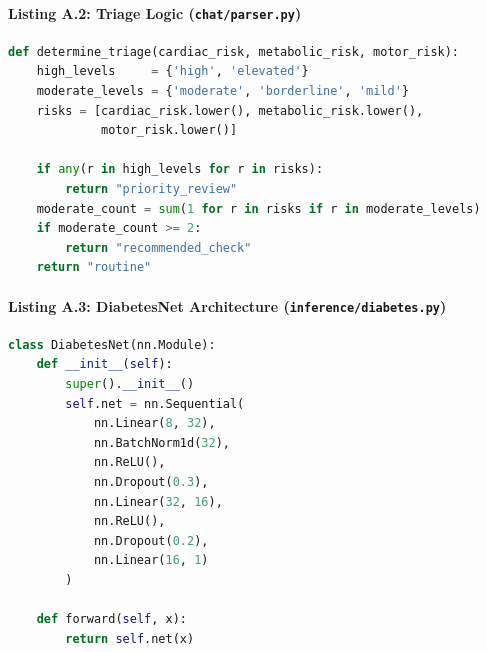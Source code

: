 \paragraph{Listing A.2: Triage Logic (\texttt{chat/parser.py})}
\begin{lstlisting}[language=Python, caption={Automated Triage Classification Function}]
def determine_triage(cardiac_risk, metabolic_risk, motor_risk):
    high_levels     = {'high', 'elevated'}
    moderate_levels = {'moderate', 'borderline', 'mild'}
    risks = [cardiac_risk.lower(), metabolic_risk.lower(),
             motor_risk.lower()]

    if any(r in high_levels for r in risks):
        return "priority_review"
    moderate_count = sum(1 for r in risks if r in moderate_levels)
    if moderate_count >= 2:
        return "recommended_check"
    return "routine"
\end{lstlisting}

\paragraph{Listing A.3: DiabetesNet Architecture (\texttt{inference/diabetes.py})}
\begin{lstlisting}[language=Python, caption={DiabetesNet Tabular Deep Neural Network}]
class DiabetesNet(nn.Module):
    def __init__(self):
        super().__init__()
        self.net = nn.Sequential(
            nn.Linear(8, 32),
            nn.BatchNorm1d(32),
            nn.ReLU(),
            nn.Dropout(0.3),
            nn.Linear(32, 16),
            nn.ReLU(),
            nn.Dropout(0.2),
            nn.Linear(16, 1)
        )

    def forward(self, x):
        return self.net(x)
\end{lstlisting}

